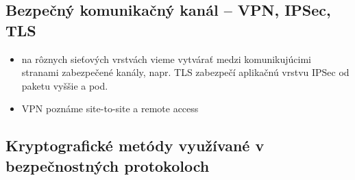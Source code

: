 \documentclass[12pt,a4paper]{article}
\begin{document}
{    \subsection{Bezpečný komunikačný kanál – VPN, IPSec, TLS}
    \begin{itemize}
        \item na rôznych sieťových vrstvách vieme vytvárať medzi komunikujúcimi stranami zabezpečené kanály, napr. TLS zabezpečí aplikačnú vrstvu IPSec od paketu vyššie a pod.
        \item VPN poznáme site-to-site a remote access
    \end{itemize}
    \subsection{Kryptografické metódy využívané v bezpečnostných protokoloch}
}
\end{document}
